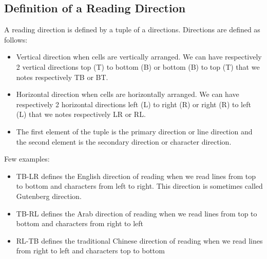 \documentclass{article}
\begin{document}
\subsection{Definition of a Reading Direction}
A reading direction is defined by a tuple of a directions. Directions are defined as follows:
\begin{itemize}
    \item Vertical direction when cells are vertically arranged. We can have respectively 2 vertical directions top (T)
    to bottom (B) or bottom (B) to top (T) that we notes respectively TB or BT. 
    \item Horizontal direction when cells are horizontally arranged. We can have respectively 2 horizontal directions
    left (L) to right (R) or right (R) to left (L) that we notes respectively LR or RL. 
    \item The first element of the tuple is the primary direction or line direction and the second element is the
    secondary direction or character direction.
\end{itemize}
Few examples:
\begin{itemize}
    \item TB-LR defines the English direction of reading when we read lines from top to bottom and characters from left
    to right. This direction is sometimes called Gutenberg direction.
    \item TB-RL defines the Arab direction of reading when we read lines from top to bottom and characters from right to
    left
    \item RL-TB defines the traditional Chinese direction of reading when we read lines from right to left and
    characters top to bottom
\end{itemize}
\end{document}
